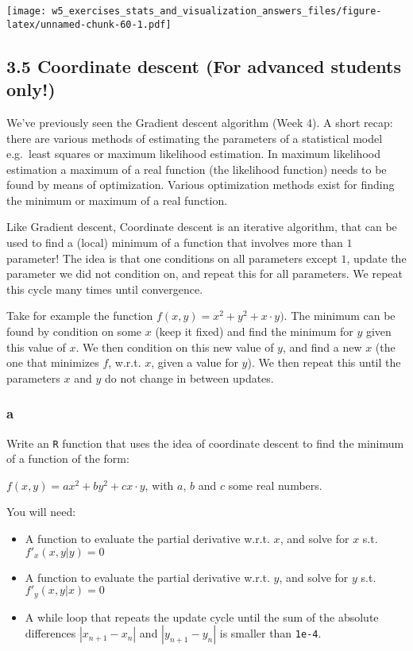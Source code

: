 \documentclass[]{article}
\providecommand{\tightlist}{%
  \setlength{\itemsep}{0pt}\setlength{\parskip}{0pt}}
\begin{document}
\texttt{[image: w5\_exercises\_stats\_and\_visualization\_answers\_files/figure-latex/unnamed-chunk-60-1.pdf]}

\hypertarget{coordinate-descent-for-advanced-students-only}{%
\subsection{3.5 Coordinate descent (For advanced students
only!)}\label{coordinate-descent-for-advanced-students-only}}

We've previously seen the Gradient descent algorithm (Week 4). A short
recap: there are various methods of estimating the parameters of a
statistical model e.g.~least squares or maximum likelihood estimation.
In maximum likelihood estimation a maximum of a real function (the
likelihood function) needs to be found by means of optimization. Various
optimization methods exist for finding the minimum or maximum of a real
function.

Like Gradient descent, Coordinate descent is an iterative algorithm,
that can be used to find a (local) minimum of a function that involves
more than \(1\) parameter! The idea is that one conditions on all
parameters except \(1\), update the parameter we did not condition on,
and repeat this for all parameters. We repeat this cycle many times
until convergence.

Take for example the function \(f(x, y) = x^2 + y^2 + x\cdot y)\). The
minimum can be found by condition on some \(x\) (keep it fixed) and find
the minimum for \(y\) given this value of \(x\). We then condition on
this new value of \(y\), and find a new \(x\) (the one that minimizes
\(f\), w.r.t. \(x\), given a value for \(y\)). We then repeat this until
the parameters \(x\) and \(y\) do not change in between updates.

\hypertarget{a-11}{%
\subsubsection{a}\label{a-11}}

Write an \texttt{R} function that uses the idea of coordinate descent to
find the minimum of a function of the form:

\(f(x, y) = ax^2 + by^2 + cx\cdot y\), with \(a\), \(b\) and \(c\) some
real numbers.

You will need:

\begin{itemize}
\tightlist
\item
  A function to evaluate the partial derivative w.r.t. \(x\), and solve
  for \(x\) s.t. \(f'_x(x, y | y) = 0\)
\item
  A function to evaluate the partial derivative w.r.t. \(y\), and solve
  for \(y\) s.t. \(f'_y(x, y | x) = 0\)
\item
  A while loop that repeats the update cycle until the sum of the
  absolute differences \(|x_{n+1} - x_{n}|\) and \(|y_{n+1} - y_{n}|\)
  is smaller than \texttt{1e-4}.
\end{itemize}
\end{document}
